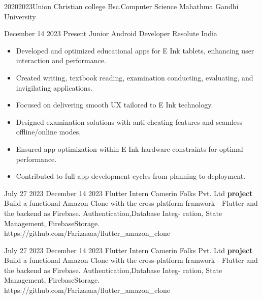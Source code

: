 {2020}{2023}{Union Christian college }
{Bsc.Computer Science}
{Mahathma Gandhi University}

{December 14 2023}
{Present}
{Junior Android Developer}
{Resolute India}
{}
{
\jbegin
   \begin{itemize}
   \item Developed and optimized educational apps for E Ink tablets, enhancing user interaction and performance.
   \item Created writing, textbook reading, examination conducting, evaluating, and invigilating applications.
   \item Focused on delivering smooth UX tailored to E Ink technology.
   \item Designed examination solutions with anti-cheating features and seamless offline/online modes.
   \item Ensured app optimization within E Ink hardware constraints for optimal performance.
   \item Contributed to full app development cycles from planning to deployment.
\end{itemize}   
\jend
}


{July 27 2023 }
{December 14 2023}
{Flutter Intern }
{Camerin Folks Pvt. Ltd }
{}
{
\jbegin
    \vspace{16pt}
  { \newline \textbf{project}
   \vspace{5pt}
  \newline   Build a functional Amazon Clone with the cross-platform framwork -
Flutter and the backend as Firebase. Authentication,Database Integ-
ration, State Management, FirebaseStorage.
\vspace{5pt}
\newline
https://github.com/Farizaaaa/flutter\_amazon\_clone  }
\jend
}

{July 27 2023 }
{December 14 2023}
{Flutter Intern }
{Camerin Folks Pvt. Ltd }
{}
{
\jbegin
    \vspace{10pt}
  { \newline \textbf{project}
   \vspace{5pt}
  \newline   Build a functional Amazon Clone with the cross-platform framwork -
Flutter and the backend as Firebase. Authentication,Database Integ-
ration, State Management, FirebaseStorage.
\vspace{5pt}
\newline
https://github.com/Farizaaaa/flutter\_amazon\_clone  }
\jend
}


